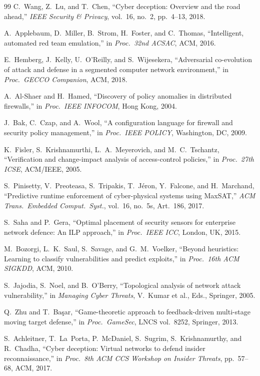 \documentclass[journal]{IEEEtran}
\begin{document}
\begin{thebibliography}{99}
C.~Wang, Z.~Lu, and T.~Chen,
``Cyber deception: Overview and the road ahead,''
\emph{IEEE Security \& Privacy}, vol.~16, no.~2,
pp.~4--13, 2018.

A.~Applebaum, D.~Miller, B.~Strom, H.~Foster, and C.~Thomas,
``Intelligent, automated red team emulation,''
in \emph{Proc.\ 32nd ACSAC}, ACM, 2016.

E.~Hemberg, J.~Kelly, U.~O'Reilly, and S.~Wijesekera,
``Adversarial co-evolution of attack and defense in a segmented
computer network environment,''
in \emph{Proc.\ GECCO Companion}, ACM, 2018.

A.~Al-Shaer and H.~Hamed,
``Discovery of policy anomalies in distributed firewalls,''
in \emph{Proc.\ IEEE INFOCOM}, Hong Kong, 2004.

J.~Bak, C.~Czap, and A.~Wool,
``A configuration language for firewall and security policy
management,''
in \emph{Proc.\ IEEE POLICY}, Washington, DC, 2009.

K.~Fisler, S.~Krishnamurthi, L.~A.~Meyerovich, and
M.~C.~Tschantz,
``Verification and change-impact analysis of access-control
policies,''
in \emph{Proc.\ 27th ICSE}, ACM/IEEE, 2005.

S.~Pinisetty, V.~Preoteasa, S.~Tripakis, T.~J\'eron,
Y.~Falcone, and H.~Marchand,
``Predictive runtime enforcement of cyber-physical systems using
MaxSAT,''
\emph{ACM Trans.\ Embedded Comput.\ Syst.}, vol.~16, no.~5s,
Art.~186, 2017.

S.~Saha and P.~Gera,
``Optimal placement of security sensors for enterprise network
defence: An ILP approach,''
in \emph{Proc.\ IEEE ICC}, London, UK, 2015.

M.~Bozorgi, L.~K.~Saul, S.~Savage, and G.~M.~Voelker,
``Beyond heuristics: Learning to classify vulnerabilities and
predict exploits,''
in \emph{Proc.\ 16th ACM SIGKDD}, ACM, 2010.

S.~Jajodia, S.~Noel, and B.~O'Berry,
``Topological analysis of network attack vulnerability,''
in \emph{Managing Cyber Threats}, V.~Kumar et al., Eds.,
Springer, 2005.

Q.~Zhu and T.~Ba\c{s}ar,
``Game-theoretic approach to feedback-driven multi-stage moving
target defense,''
in \emph{Proc.\ GameSec}, LNCS vol.~8252, Springer, 2013.

S.~Achleitner, T.~La~Porta, P.~McDaniel, S.~Sugrim,
S.~Krishnamurthy, and R.~Chadha,
``Cyber deception: Virtual networks to defend insider
reconnaissance,''
in \emph{Proc.\ 8th ACM CCS Workshop on Insider Threats},
pp.~57--68, ACM, 2017.


\end{thebibliography}
\end{document}
